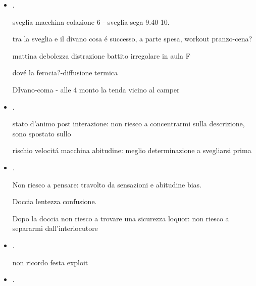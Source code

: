 \begin{itemize}
macchina: mi sveglio alle 6.30 - monto tenda - saluto il tizio coi cani:ansia per debolezza.

workout punch that head: 

mi sveglio alle 10: incertezza; workout bike: guidato da impulsi non penso. Seconda salita debolezza-stanchezza-fame: mi sento svenire fino a pranzo - panino 6 euro panineria (resto nervosismo).

Non ho voglia di finire - perdo tempo, non penso; cerco un ca\'e: sono ritornato abitudine. Ricerca soddisfazione: birra-cena.

azione: impulso sensazione essere visto
cena-pacinotti-perdo tempo-sonno-exploit-mi addormento sul tavolo

\item {}.

sveglia macchina colazione 6 - sveglia-sega 9.40-10.

tra la sveglia e il divano cosa \'e successo, a parte spesa, workout pranzo-cena?

mattina debolezza distrazione battito irregolare in aula F

dov\'e la ferocia?-diffusione termica

DIvano-coma - alle 4 monto la tenda vicino al camper

\item {}.

stato d'animo post interazione: non riesco a concentrarmi sulla descrizione,  sono spostato sullo 

rischio velocit\'a macchina abitudine: meglio determinazione a svegliarsi prima

\item {}.

Non riesco a pensare: travolto da sensazioni e abitudine bias.

Doccia lentezza confusione.

Dopo la doccia non riesco a trovare una sicurezza loquor: non riesco a separarmi dall'interlocutore

\item {}.

non ricordo festa exploit

\item {}.


\end{itemize}

